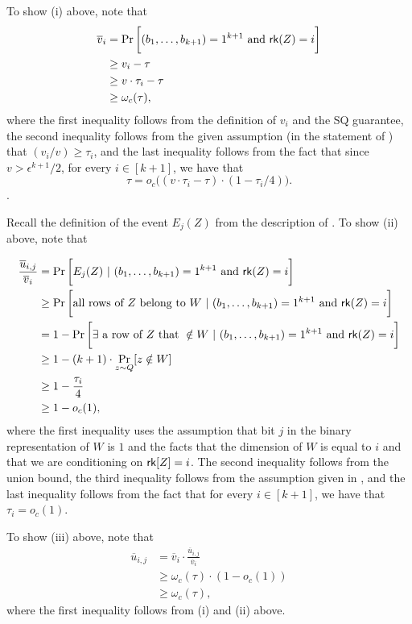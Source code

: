	To show (i) above, note that
	\begin{align*}
	\overline{v}_i &= \Pr\bigg[(b_1,\dots,b_{k+1}) = 1^{k+1}\mbox{ and }\mathsf{rk}(Z) = i \bigg]\\
	&\geq v_i - \tau\\
	&\geq v \cdot \tau_i - \tau\\
	&\geq \omega_c(\tau),
	\end{align*}
	where the first inequality follows from the definition of $v_i$ and the SQ guarantee, the second inequality follows from the given assumption (in the statement of ) that $(v_i/v) \geq \tau_i$, and the last inequality follows from the fact that since $v > \epsilon^{k+1}/2$, for every $i \in [k+1]$, we have that
	\begin{equation*}
	\tau = o_c \bigg( (v \cdot \tau_i - \tau ) \cdot (1-\tau_i/4)\bigg).
	\end{equation*}.
	
	Recall the definition of the event $E_j(Z)$ from the description of . To show (ii) above, note that
	
	\begin{align*}
	\frac{\overline{u}_{i,j}}{\overline{v}_i} &= \Pr\bigg[E_j(Z) ~ | ~ (b_1,\dots,b_{k+1}) = 1^{k+1}\mbox{ and }\mathsf{rk}(Z) = i \bigg]\\
	&\geq \Pr\bigg[\text{all rows of } Z \text{ belong to } W ~ | ~ (b_1,\dots,b_{k+1}) = 1^{k+1}\mbox{ and }\mathsf{rk}(Z) = i \bigg]\\
	&= 1- \Pr\bigg[\exists\text{ a row of } Z \text{ that } \notin W ~ | ~ (b_1,\dots,b_{k+1}) = 1^{k+1}\mbox{ and }\mathsf{rk}(Z) = i \bigg]\\
	&\geq 1 - (k+1) \cdot \Pr_{z \sim Q}[z \notin W]\\
	&\geq 1 - \frac{\tau_i}{4}\\
	&\geq 1- o_c(1),
	\end{align*}
	where the first inequality uses the assumption that bit $j$ in the binary representation of $W$ is $1$ and the facts that the dimension of $W$ is equal to $i$ and that we are conditioning on $\mathsf{rk}[Z] = i$. The second inequality follows from the union bound, the third inequality follows from the assumption given in , and the last inequality follows from the fact that for every $i \in [k+1]$, we have that $\tau_i = o_c(1)$.
	
	To show (iii) above, note that
	\begin{align*}
	\overline{u}_{i,j} &= \overline{v}_i \cdot \frac{\overline{u}_{i,j}}{\overline{v}_i}\\
	&\geq \omega_c(\tau) \cdot (1- o_c(1))\\
	&\geq \omega_c(\tau),
	\end{align*}
	where the first inequality follows from (i) and (ii) above.
	
